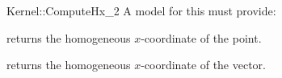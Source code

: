 \begin{ccRefFunctionObjectConcept}{Kernel::ComputeHx_2}
A model for this must provide:


       {returns the homogeneous $x$-coordinate of the point.}

       {returns the homogeneous $x$-coordinate of the vector.}

\ccRefines
{}



\end{ccRefFunctionObjectConcept}
